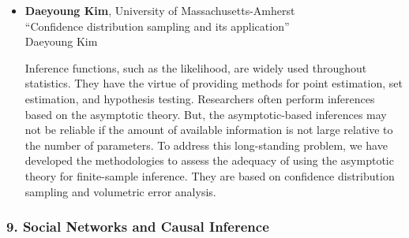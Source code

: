 \begin{itemize}
\item \textbf{Daeyoung Kim}, University of Massachusetts-Amherst \\
``Confidence distribution sampling and its application'' \\
Daeyoung Kim


Inference functions, such as the likelihood, are widely used throughout statistics. They have the virtue of providing methods for point estimation, set estimation, and hypothesis testing.
Researchers often perform  inferences based on the asymptotic theory.  
But, the asymptotic-based inferences may not be reliable if the amount of available information is not large relative to the number of parameters. 
To address this long-standing problem, we have developed the methodologies to assess the adequacy of using the asymptotic
theory for finite-sample inference.  They are based on confidence distribution sampling and volumetric error analysis.

\end{itemize}

\subsubsection*{9. Social Networks and Causal Inference}

